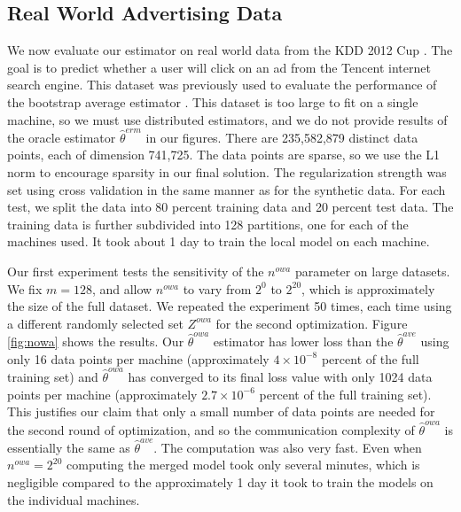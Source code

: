 \documentclass[twoside]{article}
\newcommand{\Zowa}{Z^{\textit{owa}}}
\newcommand{\nowa}{n^{\textit{owa}}}
\newcommand{\w}{\theta}
\newcommand{\wowa}{\hat\w^{owa}}
\newcommand{\wave}{\hat\w^{ave}}
\newcommand{\wboot}{\hat\w^{boot}}
\newcommand{\wmle}{\hat\w^{erm}}
\begin{document}
\subsection{Real World Advertising Data}

\vspace{-0.1in}
We now evaluate our estimator on real world data from the KDD 2012 Cup \citep{kddcup2012}.
The goal is to predict whether a user will click on an ad from the Tencent internet search engine.
This dataset was previously used to evaluate the performance of the bootstrap average estimator \citep{zhang2012communication}.
This dataset is too large to fit on a single machine,
so we must use distributed estimators,
and we do not provide results of the oracle estimator $\wmle$ in our figures.
There are 235,582,879 distinct data points,
each of dimension 741,725.
The data points are sparse, so we use the L1 norm to encourage sparsity in our final solution.
The regularization strength was set using cross validation in the same manner as for the synthetic data.
For each test, we split the data into 80 percent training data and 20 percent test data.
The training data is further subdivided into 128 partitions,
one for each of the machines used.
It took about 1 day to train the local model on each machine.

Our first experiment tests the sensitivity of the $\nowa$ parameter on large datasets.
We fix $m=128$, and allow $\nowa$ to vary from $2^0$ to $2^{20}$,
which is approximately the size of the full dataset.
We repeated the experiment 50 times, each time using a different randomly selected set $\Zowa$ for the second optimization.
Figure \ref{fig:nowa} shows the results.
Our $\wowa$ estimator has lower loss than the $\wave$ using only 16 data points per machine (approximately $4\times10^{-8}$ percent of the full training set)
and $\wowa$ has converged to its final loss value with only 1024 data points per machine (approximately $2.7\times10^{-6}$ percent of the full training set).
This justifies our claim that only a small number of data points are needed for the second round of optimization,
and so the communication complexity of $\wowa$ is essentially the same as $\wave$.
The computation was also very fast.
Even when $\nowa=2^{20}$ computing the merged model took only several minutes,
which is negligible compared to the approximately 1 day it took to train the models on the individual machines. 
\end{document}
